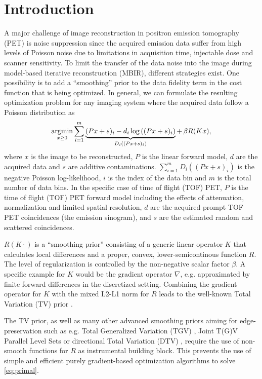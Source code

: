 \section{Introduction}

A major challenge of image reconstruction in positron emission tomography (PET)
is noise suppression since the acquired emission data suffer from high levels of Poisson
noise due to limitations in acquisition time, injectable dose and scanner sensitivity.
To limit the transfer of the data noise into the image during model-based iterative
reconstruction (MBIR), different strategies exist. 
One possibility is to add a ``smoothing'' prior to the data fidelity term in the cost
function that is being optimized.
In general, we can formulate the resulting optimization problem for any imaging system where the
acquired data follow a Poisson distribution as
%
\begin{equation}
\operatorname*{argmin} _{x\geq 0} \sum_{i=1}^{m} \underbrace{(Px + s)_i -  d_i \log \left( (Px + s)_i \right)}_{D_i((Px+s)_i)} + \, \beta R(Kx),
\label{eq:primal} 
\end{equation}
%
where $x$ is the image to be reconstructed, $P$ is the linear forward model, $d$ are the acquired
data and $s$ are additive contaminations.
$\sum_{i=1}^m D_i((Px + s)_i)$ is the negative Poisson log-likelihood, 
$i$ is the index of the data bin and $m$ is the total number of data bins.
In the specific case of time of flight (TOF) PET, $P$ is the time of flight (TOF) PET
forward model including the effects of attenuation, normalization and limited spatial resolution, 
$d$ are the acquired prompt TOF PET coincidences (the emission sinogram), 
and $s$ are the estimated random and scattered coincidences. 

$R(K\cdot)$ is a ``smoothing prior'' consisting of a generic linear operator $K$ that calculates 
local differences and a proper, convex, lower-semicontinous function $R$.
The level of regularization is controlled by the non-negative scalar factor $\beta$.
A specific example for $K$ would be the gradient operator $\nabla$, e.g. approximated by finite forward 
differences in the discretized setting.
Combining the gradient operator for $K$ with the mixed L2-L1 norm for $R$ leads to the well-known 
Total Variation (TV) prior \cite{Rudin1992}.

The TV prior, as well as many other advanced smoothing priors aiming for edge-preservation 
such as e.g. Total Generalized Variation (TGV) 
\cite{Bredies2010}, Joint T(G)V \cite{Rigie2015,Knoll2016}
Parallel Level Sets \cite{Ehrhardt2016a,Schramm2017} or directional Total Variation (DTV)
\cite{Ehrhardt2016}, require the use of non-smooth functions for $R$ as instrumental building block.
This prevents the use of simple and efficient 
purely gradient-based optimization algorithms to solve \eqref{eq:primal}.

